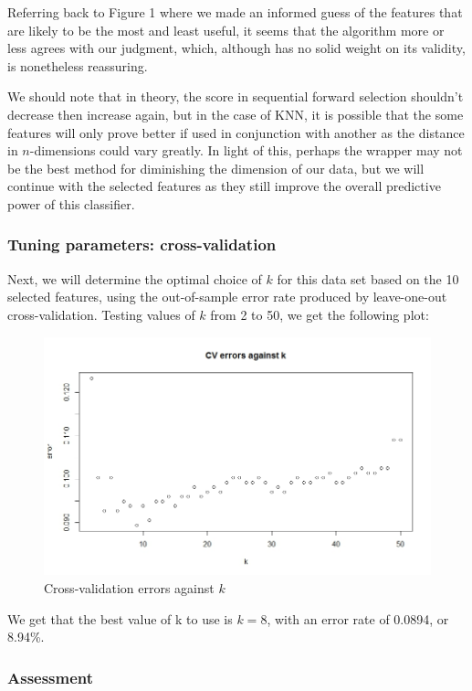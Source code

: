 \documentclass[11pt, a4paper]{article}
\begin{document}
Referring back to Figure 1 where we made an informed guess of the features that are likely to be the most and least useful, it seems that the algorithm more or less agrees with our judgment, which, although has no solid weight on its validity, is nonetheless reassuring.

We should note that in theory, the score in sequential forward selection shouldn't decrease then increase again, but in the case of KNN, it is possible that the some features will only prove better if used in conjunction with another as the distance in $n$-dimensions could vary greatly. In light of this, perhaps the wrapper may not be the best method for diminishing the dimension of our data, but we will continue with the selected features as they still improve the overall predictive power of this classifier.


\subsubsection{Tuning parameters: cross-validation}
Next, we will determine the optimal choice of $k$ for this data set based on the 10 selected features, using the out-of-sample error rate produced by leave-one-out cross-validation. Testing values of $k$ from 2 to 50, we get the following plot:

\begin{figure}[H]
\centering
	\includegraphics[scale=0.4]{knncv.jpeg}
\caption{Cross-validation errors against $k$}
\end{figure}

We get that the best value of k to use is $k=8$, with an error rate of 0.0894, or 8.94\%.


\subsubsection{Assessment}
\end{document}
